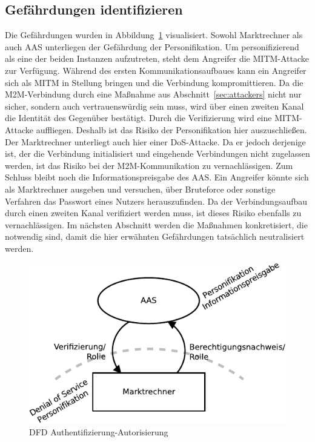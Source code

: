 \documentclass[11pt,a4paper]{report}
\begin{document}
\subsection{Gefährdungen identifizieren}

Die Gefährdungen wurden in Abbildung~\ref{fig:dfd_auth_threat} visualisiert. Sowohl Marktrechner als auch AAS unterliegen der Gefährdung der Personifikation. Um personifizierend als eine der beiden Instanzen aufzutreten, steht dem Angreifer die MITM-Attacke zur Verfügung. Während des ersten Kommunikationsaufbaues kann ein Angreifer sich als MITM in Stellung bringen und die Verbindung kompromittieren. Da die M2M-Verbindung durch eine Maßnahme aus Abschnitt~\ref{sec:attackers} nicht nur sicher, sondern auch vertrauenswürdig sein muss, wird über einen zweiten Kanal die Identität des Gegenüber bestätigt. Durch die Verifizierung wird eine MITM-Attacke auffliegen. Deshalb ist das Risiko der Personifikation hier auszuschließen. Der Marktrechner unterliegt auch hier einer DoS-Attacke. Da er jedoch derjenige ist, der die Verbindung initialisiert und eingehende Verbindungen nicht zugelassen werden, ist das Risiko bei der M2M-Kommunikation zu vernachlässigen. Zum Schluss bleibt noch die Informationspreisgabe des AAS. Ein Angreifer könnte sich als Marktrechner ausgeben und versuchen, über Bruteforce oder sonstige Verfahren das Passwort eines Nutzers herauszufinden. Da der Verbindungsaufbau durch einen zweiten Kanal verifiziert werden muss, ist dieses Risiko ebenfalls zu vernachlässigen. Im nächsten Abschnitt werden die Maßnahmen konkretisiert, die notwendig sind, damit die hier erwähnten Gefährdungen tatsächlich neutralisiert werden.

\begin{figure}[htbp]
\centering
\includegraphics[scale=1.1]{images/dfd_auth_threat.pdf}
\caption{DFD Authentifizierung-Autorisierung}
\label{fig:dfd_auth_threat}
\end{figure}
\end{document}
